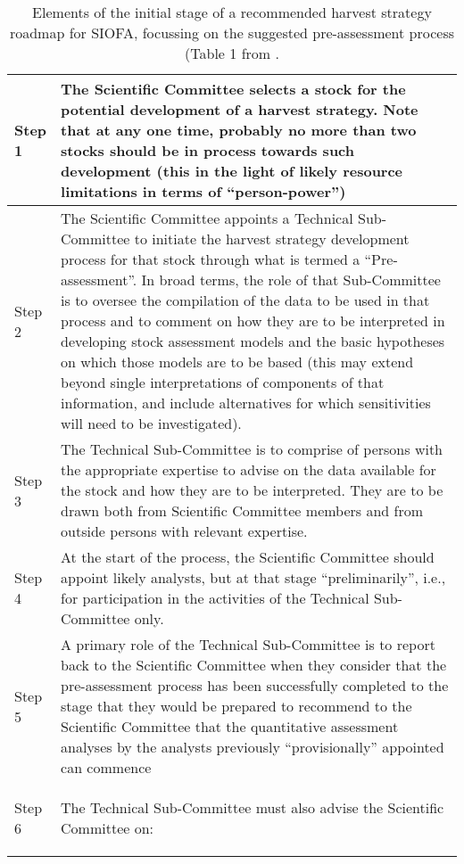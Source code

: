 \begin{table}[H]
  \centering
    \caption{\label{Table1}Elements of the initial stage of a recommended harvest strategy roadmap for SIOFA, focussing on the suggested pre-assessment process (Table 1 from \cite{butterworth_development_2022}.}
    \begin{tabular}{|p{0.1\linewidth}|p{0.9\linewidth}|}
      \hline
      Step 1 & The Scientific Committee selects a stock for the potential development of a harvest strategy. Note that at any one time, probably no more than two stocks should be in process towards such development (this in the light of likely resource limitations in terms of “person-power”) \\
      \hline
      Step 2 & The Scientific Committee appoints a Technical Sub-Committee to initiate the harvest strategy development process for that stock through what is termed a “Pre-assessment”. In broad terms, the role of that Sub-Committee is to oversee the compilation of the data to be used in that process and to comment on how they are to be interpreted in developing stock assessment models and the basic hypotheses on which those models are to be based (this may extend beyond single interpretations of components of that information, and include alternatives for which sensitivities will need to be investigated). \\
      \hline
      Step 3 & The Technical Sub-Committee is to comprise of persons with the appropriate expertise to advise on the data available for the stock and how they are to be interpreted. They are to be drawn both from Scientific Committee members and from outside persons with relevant expertise. \\
      \hline
      Step 4 &  At the start of the process, the Scientific Committee should appoint likely analysts, but at that stage “preliminarily”, i.e., for participation in the activities of the Technical Sub-Committee only. \\
      \hline
      Step 5 & A primary role of the Technical Sub-Committee is to report back to the Scientific Committee when they consider that the pre-assessment process has been successfully completed to the stage that they would be prepared to recommend to the Scientific Committee that the quantitative assessment analyses by the analysts previously “provisionally” appointed can commence \\
      \hline
      Step 6 & The Technical Sub-Committee must also advise the Scientific Committee on:
      \begin{enumerate}

\end{enumerate}
\end{tabular}
\end{table}
